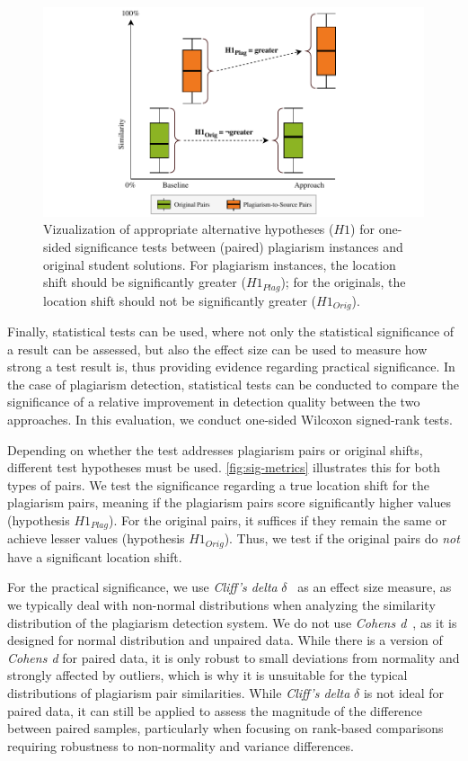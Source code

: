 \begin{figure}
    \centering
    \includegraphics[width=0.95\linewidth]{figures/methodology/SigMetrics.pdf}
    \caption[Statistical Testing in Plagiarism Evaluations]{Vizualization of appropriate alternative hypotheses ($H1$) for one-sided significance tests between (paired) plagiarism instances and original student solutions. For plagiarism instances, the location shift should be significantly greater ($H1_{Plag}$); for the originals, the location shift should not be significantly greater ($H1_{Orig}$).}
    \label{fig:sig-metrics}
\end{figure}

Finally, statistical tests can be used, where not only the statistical significance of a result can be assessed, but also the effect size can be used to measure how strong a test result is, thus providing evidence regarding practical significance.
In the case of plagiarism detection, statistical tests can be conducted to compare the significance of a relative improvement in detection quality between the two approaches. 
In this evaluation, we conduct one-sided Wilcoxon signed-rank tests.

Depending on whether the test addresses plagiarism pairs or original shifts, different test hypotheses must be used. \autoref{fig:sig-metrics} illustrates this for both types of pairs. We test the significance regarding a true location shift for the plagiarism pairs, meaning if the plagiarism pairs score significantly higher values (hypothesis $H1_{Plag}$). For the original pairs, it suffices if they remain the same or achieve lesser values (hypothesis $H1_{Orig}$). Thus, we test if the original pairs do \textit{not} have a significant location shift.

For the practical significance, we use \textit{Cliff's delta} $\delta$~\cite{Cliff1993} as an effect size measure, as we typically deal with non-normal distributions when analyzing the similarity distribution of the plagiarism detection system. We do not use \textit{Cohens d}~\cite{Cohen1988}, as it is designed for normal distribution and unpaired data.
While there is a version of \textit{Cohens d} for paired data, it is only robust to small deviations from normality and strongly affected by outliers, which is why it is unsuitable for the typical distributions of plagiarism pair similarities. While \textit{Cliff's delta} $\delta$ is not ideal for paired data, it can still be applied to assess the magnitude of the difference between paired samples, particularly when focusing on rank-based comparisons requiring robustness to non-normality and variance differences.

